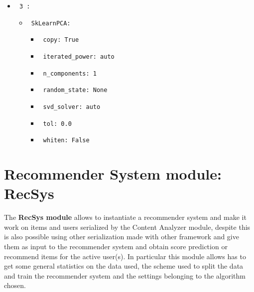 \documentclass[11pt]{article}
\begin{document}
\begin{itemize}
\begin{itemize}
           \end{itemize}
    \item
     \verb| 3 :|
     \begin{itemize}
             \item
            \verb| SkLearnPCA: |

                   \begin{itemize}
                                    \item
                        \verb| copy: True |
                                    \item
                        \verb| iterated_power: auto |
                                    \item
                        \verb| n_components: 1 |
                                    \item
                        \verb| random_state: None |
                                    \item
                        \verb| svd_solver: auto |
                                    \item
                        \verb| tol: 0.0 |
                                    \item
                        \verb| whiten: False |
                            \end{itemize}
       
           \end{itemize}
\end{itemize}
\hfill\break
\hfill\break






\section{Recommender System module: RecSys}\label{sec:recsys}
The \textbf{RecSys module} allows to instantiate a recommender system and make it work on items and users serialized
by the Content Analyzer module, despite this is also possible using other serialization made with other framework and
give them as input to the recommender system and obtain score prediction or recommend items for the active user(s).
In particular this module allows has to get some general statistics on the data used, the scheme used to split the data
and train the recommender system and the settings belonging to the algorithm chosen.
\hfill\break
\hfill\break
\end{document}
